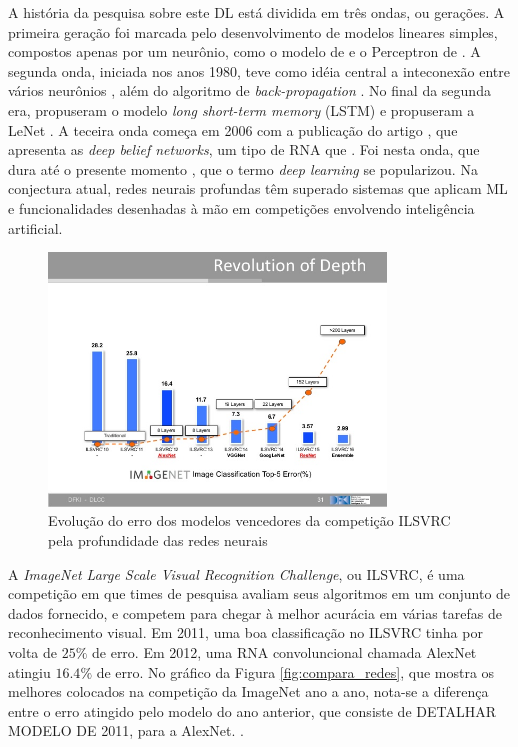 A história da pesquisa sobre este DL está dividida em três ondas, ou gerações. A primeira geração foi marcada pelo desenvolvimento de modelos lineares simples, compostos apenas por um neurônio, como o modelo de \cite{mcculloch1943logical} e o Perceptron de \cite{rosenblatt1958perceptron}. A segunda onda, iniciada nos anos 1980, teve como idéia central a inteconexão entre vários neurônios \cite{rumelhart1986parallel}, além do algoritmo de \emph{back-propagation} \cite{rumelhart1986backpropagation}. No final da segunda era, \cite{hochreiter1997long} propuseram o modelo \emph{long short-term memory} (LSTM) e \cite{lenet} propuseram a LeNet . A teceira onda começa em 2006 com a publicação do artigo \cite{hinton2006fast}, que apresenta as \emph{deep belief networks}, um tipo de RNA que  . Foi nesta onda, que dura até o presente momento \cite{goodfellow2016deep}, que o termo \emph{deep learning} se popularizou. Na conjectura atual, redes neurais profundas têm superado sistemas que aplicam ML e funcionalidades desenhadas à mão em competições envolvendo inteligência artificial.

\begin{figure}[!h]
	\centering
	\includegraphics[width=0.8\textwidth]{img/compara_redes_ilsvrc.png}
	\caption{Evolução do erro dos modelos vencedores da competição ILSVRC pela profundidade das redes neurais \cite{dl_ILSVRC}}
	\label{fig:compara_redes_ilsvrc}
\end{figure}

A \emph{ImageNet Large Scale Visual Recognition Challenge}, ou ILSVRC, é uma competição em que times de pesquisa avaliam seus algoritmos em um conjunto de dados fornecido, e competem para chegar à melhor acurácia em várias tarefas de reconhecimento visual. Em 2011, uma boa classificação no ILSVRC tinha por volta de $25\%$ de erro. Em 2012, uma RNA convoluncional chamada AlexNet atingiu $16.4\%$ de erro. No gráfico da Figura \ref{fig:compara_redes}, que mostra os melhores colocados na competição da ImageNet ano a ano, nota-se a diferença entre o erro atingido pelo modelo do ano anterior, que consiste de DETALHAR MODELO DE 2011, para a AlexNet. .

